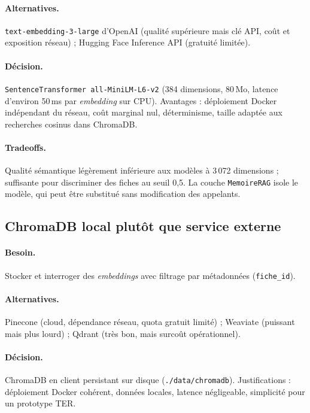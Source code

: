 \paragraph{Alternatives.} \texttt{text-embedding-3-large} d'OpenAI (qualité supérieure mais clé API, coût et exposition réseau) ; Hugging Face Inference API (gratuité limitée).

\paragraph{Décision.} \texttt{SentenceTransformer all-MiniLM-L6-v2} (384 dimensions, 80\,Mo, latence d'environ 50\,ms par \textit{embedding} sur CPU). Avantages : déploiement Docker indépendant du réseau, coût marginal nul, déterminisme, taille adaptée aux recherches cosinus dans ChromaDB.

\paragraph{Tradeoffs.} Qualité sémantique légèrement inférieure aux modèles à 3\,072 dimensions ; suffisante pour discriminer des fiches au seuil 0,5. La couche \texttt{MemoireRAG} isole le modèle, qui peut être substitué sans modification des appelants.

\subsection{ChromaDB local plutôt que service externe}

\paragraph{Besoin.} Stocker et interroger des \textit{embeddings} avec filtrage par métadonnées (\texttt{fiche\_id}).

\paragraph{Alternatives.} Pinecone (cloud, dépendance réseau, quota gratuit limité) ; Weaviate (puissant mais plus lourd) ; Qdrant (très bon, mais surcoût opérationnel).

\paragraph{Décision.} ChromaDB en client persistant sur disque (\texttt{./data/chromadb}). Justifications : déploiement Docker cohérent, données locales, latence négligeable, simplicité pour un prototype TER.

